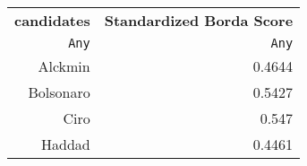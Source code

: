\begin{table}
  \begin{tabular}{rr}
    \hline\hline
    \textbf{candidates} & \textbf{Standardized Borda Score} \\
    \texttt{Any} & \texttt{Any} \\\hline
    Alckmin & 0.4644 \\
    Bolsonaro & 0.5427 \\
    Ciro & 0.547 \\
    Haddad & 0.4461 \\\hline\hline
  \end{tabular}
\end{table}
